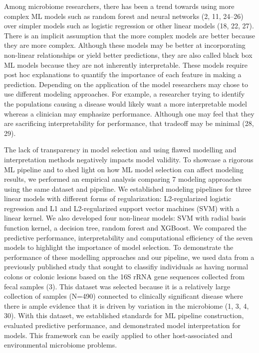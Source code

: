 \documentclass[11pt,]{article}
\begin{document}
Among microbiome researchers, there has been a trend towards using more
complex ML models such as random forest and neural networks (2, 11,
24--26) over simpler models such as logistic regression or other linear
models (18, 22, 27). There is an implicit assumption that the more
complex models are better because they are more complex. Although these
models may be better at incorporating non-linear relationships or yield
better predictions, they are also called black box ML models because
they are not inherently interpretable. These models require post hoc
explanations to quantify the importance of each feature in making a
prediction. Depending on the application of the model researchers may
chose to use different modeling approaches. For example, a researcher
trying to identify the populations causing a disease would likely want a
more interpretable model whereas a clinician may emphasize performance.
Although one may feel that they are sacrificing interpretability for
performance, that tradeoff may be minimal (28, 29).

The lack of transparency in model selection and using flawed modelling
and interpretation methods negatively impacts model validity. To
showcase a rigorous ML pipeline and to shed light on how ML model
selection can affect modeling results, we performed an empirical
analysis comparing 7 modeling approaches using the same dataset and
pipeline. We established modeling pipelines for three linear models with
different forms of regularization: L2-regularized logistic regression
and L1 and L2-regularized support vector machines (SVM) with a linear
kernel. We also developed four non-linear models: SVM with radial basis
function kernel, a decision tree, random forest and XGBoost. We compared
the predictive performance, interpretability and computational
efficiency of the seven models to highlight the importance of model
selection. To demonstrate the performance of these modelling approaches
and our pipeline, we used data from a previously published study that
sought to classifiy individuals as having normal colons or colonic
lesions based on the 16S rRNA gene sequences collected from fecal
samples (3). This dataset was selected because it is a relatively large
collection of samples (N=490) connected to clinically significant
disease where there is ample evidence that it is driven by variation in
the microbiome (1, 3, 4, 30). With this dataset, we established
standards for ML pipeline construction, evaluated predictive
performance, and demonstrated model interpretation for models. This
framework can be easily applied to other host-associated and
environmental microbiome problems.
\end{document}

